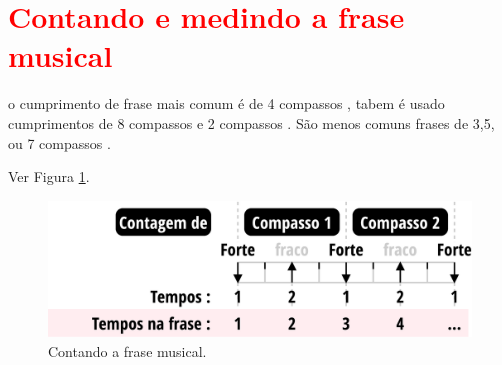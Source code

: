 \section{\textcolor{red}{Contando e medindo a frase musical}}
\cite[pp. 148,150]{medteoria}

\cite[pp. 336]{medteoria}

o cumprimento de frase mais comum é
de 4 compassos \cite[pp. 624]{latham2008diccionario} \cite[pp. 335]{medteoria} \cite[pp. 34]{bennett1993elementos},
tabem é usado cumprimentos de 8 compassos \cite[pp. 335]{medteoria} \cite[pp. 34]{bennett1993elementos}
e 2 compassos \cite[pp. 34]{bennett1993elementos}.
São menos comuns frases de 3,5, ou 7 compassos \cite[pp. 34]{bennett1993elementos}.

Ver Figura \ref{fig:contagemtemposfrase}.
\begin{figure}
    \centering
    \includegraphics[width=\textwidth]{chapters/cap-musicalidade/contagemtemposfrase.eps}
    \caption{Contando a frase musical.}
    \label{fig:contagemtemposfrase}
\end{figure}


